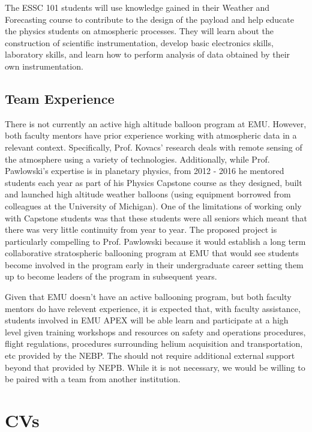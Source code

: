 \documentclass[12pt]{article}
\begin{document}
The ESSC 101 students will use knowledge gained
in their Weather and Forecasting course to contribute to the design of the payload and help educate
the physics students on atmospheric processes. They will learn about
the construction of scientific instrumentation, develop basic electronics skills, laboratory skills,
and learn how to perform analysis of data obtained by their own instrumentation.

\subsection{Team Experience}
There is not currently an active high altitude balloon program at EMU. However, both faculty mentors have
prior experience working with atmospheric data in a relevant context. Specifically,
Prof. Kovacs' research deals with remote sensing of the atmosphere using a variety of technologies.
Additionally, while Prof. Pawlowski's expertise is in planetary physics, from 2012 - 2016 he
mentored students each year as part of his Physics
Capstone course as they designed, built and launched high altitude weather balloons (using
equipment borrowed from colleagues at the University of Michigan). One of the
limitations of working only with Capstone students
was that these students were all seniors which meant that there was very little continuity from year to year.
The proposed project is particularly compelling to Prof. Pawlowski
because it would establish a long term collaborative
stratospheric ballooning program at EMU that would see students become involved in the program
early in their undergraduate career setting them up to become leaders of the program in subsequent years.

Given that EMU doesn't have an active ballooning program, but both faculty mentors
do have relevent experience, it is expected that, with faculty assistance, students involved in EMU APEX will be able learn
and participate at a high level given training workshops and resources on safety and operations procedures, flight regulations,
procedures surrounding helium acquisition and transportation, etc provided by the NEBP.
The should not require additional external support beyond that provided by NEPB.
While it is not necessary, we would be willing to be paired with a team from
another institution.



\newpage
\section{CVs}
\end{document}
